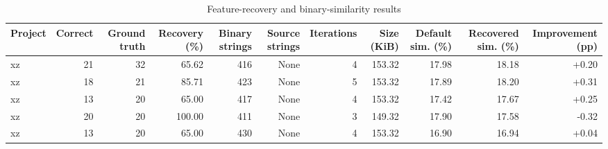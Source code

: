 \begin{table}[htbp]
\centering
\caption{Feature-recovery and binary-similarity results}
\label{tab:feature-recovery-results}
\small
\begin{tabular}{lrrrrrrrrrr}
\toprule
Project & Correct & Ground truth & Recovery (\%) & Binary strings & Source strings & Iterations & Size (KiB) & Default sim. (\%) & Recovered sim. (\%) & Improvement (pp) \\
\midrule
xz & 21 & 32 & 65.62 & 416 & None & 4 & 153.32 & 17.98 & 18.18 & +0.20 \\
xz & 18 & 21 & 85.71 & 423 & None & 5 & 153.32 & 17.89 & 18.20 & +0.31 \\
xz & 13 & 20 & 65.00 & 417 & None & 4 & 153.32 & 17.42 & 17.67 & +0.25 \\
xz & 20 & 20 & 100.00 & 411 & None & 3 & 149.32 & 17.90 & 17.58 & -0.32 \\
xz & 13 & 20 & 65.00 & 430 & None & 4 & 153.32 & 16.90 & 16.94 & +0.04 \\
\bottomrule
\end{tabular}
\end{table}
